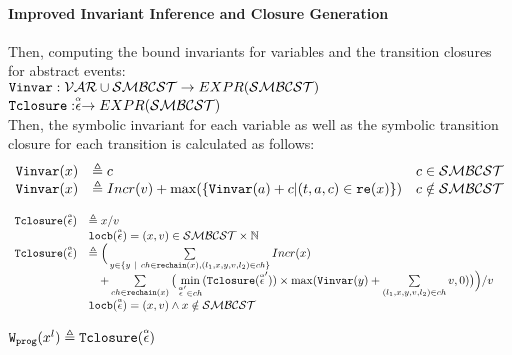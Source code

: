 \paragraph*{Improved Invariant Inference and Closure Generation}
Then, computing the bound invariants for variables and the transition closures for abstract events:
\\ 
$ {\mathtt{Vinvar}}: \mathcal{VAR} \cup \mathcal{SMBCST} \to EXPR(\mathcal{SMBCST})$
\\
${\mathtt{Tclosure}}: \stackrel{\scriptscriptstyle{\alpha}}{\mathtt{\epsilon}{}} \to EXPR(\mathcal{SMBCST})$
\\
Then, the symbolic invariant for each variable 
as well as the symbolic transition closure for each transition is calculated as follows:
\[ 
\begin{array}{lll}
  {\ensuremath{\mathtt{Vinvar}}}(x) & \triangleq c & c \in \mathcal{SMBCST} \\
  {\mathtt{Vinvar}}(x) & \triangleq Incr(v) + \max(\{{\mathtt{Vinvar}}(a) + c | (t, a, c) \in \mathtt{re}(x)\}) & c \notin \mathcal{SMBCST}
\end{array}
\]
%
\begin{defn}
  \label{def:transition_closure}
\[ 
\begin{array}{lll}
  {\ensuremath{\mathtt{Tclosure}}}(\stackrel{\scriptscriptstyle{\alpha}}{\mathtt{\epsilon}{}}) 
  & \triangleq x / v & \\ 
  & \mathtt{locb}(\stackrel{\scriptscriptstyle{\alpha}}{\mathtt{\epsilon}{}}) = (x, v) \in \mathcal{SMBCST} \times \mathbb{N} & \\
  {\mathtt{Tclosure}}(\stackrel{\scriptscriptstyle{\alpha}}{\mathtt{\epsilon}{}}) 
  & \triangleq \Big(
    \sum\limits_{y \in \{ y ~|~ 
    ch \in \mathtt{rechain}(x), (l_1, x, y, v, l_2) \in ch \} } Incr(x) & \\
    & \quad + 
  \sum\limits_{ch \in \mathtt{rechain}(x)}
  \big( \min\limits_{\stackrel{\scriptscriptstyle{\alpha}}{\mathtt{\epsilon}{}}' \in ch}({{\mathtt{Tclosure}}(\stackrel{\scriptscriptstyle{\alpha}}{\mathtt{\epsilon}{}}')}) \times 
  \max({\mathtt{Vinvar}}(y) + \sum\limits_{(l_1, x, y, v, l_2) \in ch } v, 0)\big) \Big) / v & \\
  & \mathtt{locb}(\stackrel{\scriptscriptstyle{\alpha}}{\mathtt{\epsilon}{}}) = (x, v) \land x \notin \mathcal{SMBCST} & 
\end{array}
  \]
\end{defn}
$
\mathtt{{W_{prog}}}(x^l) 
  \triangleq {\ensuremath{\mathtt{Tclosure}}}(\stackrel{\scriptscriptstyle{\alpha}}{\mathtt{\epsilon}{}})
$
